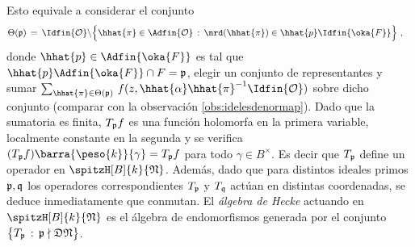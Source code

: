 Esto equivale a considerar el conjunto
\begin{align*}
	\Theta(\frak{p}) & \,=\, \Idfin{\cal{O}}\backslash
		\Big\{\hhat{\pi}\in\Adfin{\cal{O}}\,:\,
			\nrd(\hhat{\pi})\in\hhat{p}\Idfin{\oka{F}}\Big\}
	\text{ ,}
\end{align*}
%
donde $\hhat{p}\in\Adfin{\oka{F}}$ es tal que
$\hhat{p}\Adfin{\oka{F}}\cap F=\frak{p}$, elegir un conjunto de representantes
y sumar
\begin{math}
	\sum_{\hhat{\pi}\in\Theta(\frak{p})}\,
		f(z,\hhat{\alpha}\hhat{\pi}^{-1}\Idfin{\cal{O}})
\end{math}
sobre dicho conjunto (comparar con la observaci\'{o}n
\ref{obs:idelesdenormap}).
Dado que la sumatoria es finita, $T_{\frak{p}}f$ es una funci\'{o}n holomorfa
en la primera variable, localmente constante en la segunda y se verifica
$(T_{\frak{p}}f)\barra{\peso{k}}{\gamma}=T_{\frak{p}}f$ para todo
$\gamma\in B^{\times}$. Es decir que $T_{\frak{p}}$ define un operador en
$\spitzH[B]{k}{\frak{N}}$. Adem\'{a}s, dado que para distintos ideales primos
$\frak{p},\frak{q}$ los operadores correspondientes $T_{\frak{p}}$ y
$T_{\frak{q}}$ act\'{u}an en distintas coordenadas, se deduce inmediatamente
que conmutan. El \emph{\'{a}lgebra de Hecke} actuando en
$\spitzH[B]{k}{\frak{N}}$ es el \'{a}lgebra de endomorfismos generada por el
conjunto $\big\{ T_{\frak{p}}\,:\,\frak{p}\nmid\frak{D}\frak{N}\big\}$.

